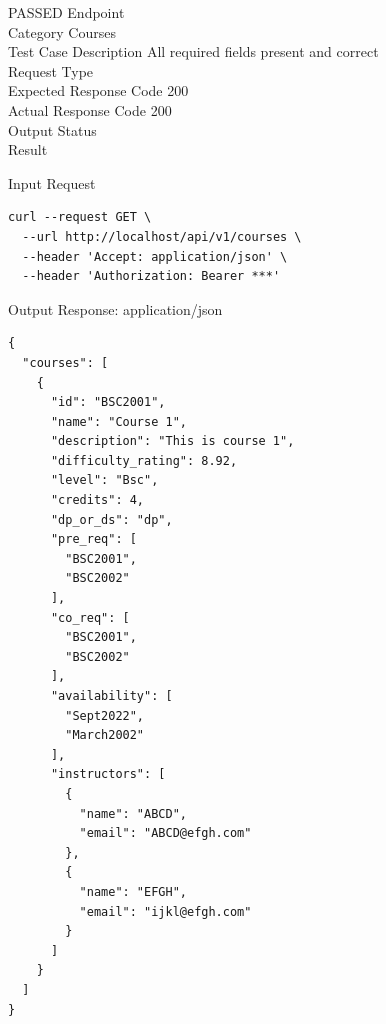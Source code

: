 \begin{testcase}{74}{PASSED}
Endpoint \hfill {}\\
Category \hfill Courses\\
Test Case Description \hfill All required fields present and correct\\

Request Type    \hfill {}\\
Expected Response Code    \hfill 200\\
Actual Response Code    \hfill 200\\

Output Status \hfill {}\\
Result \hfill {}

\begin{ipblock}{Input Request}
\begin{verbatim}
curl --request GET \
  --url http://localhost/api/v1/courses \
  --header 'Accept: application/json' \
  --header 'Authorization: Bearer ***'
\end{verbatim}
\end{ipblock}

\begin{opblock}{Output Response: application/json}
\begin{verbatim}
{
  "courses": [
    {
      "id": "BSC2001",
      "name": "Course 1",
      "description": "This is course 1",
      "difficulty_rating": 8.92,
      "level": "Bsc",
      "credits": 4,
      "dp_or_ds": "dp",
      "pre_req": [
        "BSC2001",
        "BSC2002"
      ],
      "co_req": [
        "BSC2001",
        "BSC2002"
      ],
      "availability": [
        "Sept2022",
        "March2002"
      ],
      "instructors": [
        {
          "name": "ABCD",
          "email": "ABCD@efgh.com"
        },
        {
          "name": "EFGH",
          "email": "ijkl@efgh.com"
        }
      ]
    }
  ]
}
\end{verbatim}
\end{opblock}
\end{testcase}


